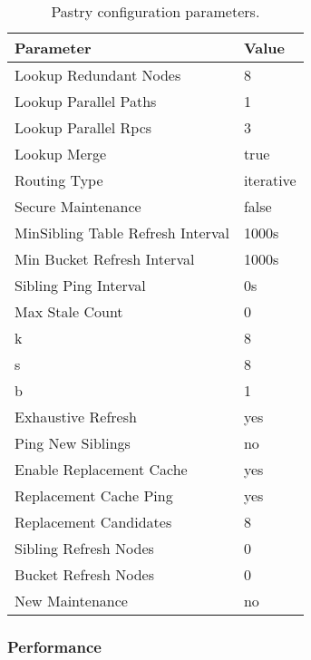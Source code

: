 \begin{table}[htbp]
\centering
\begin{tabular}{|l|l|}
\hline
Parameter                       & Value\\
\hline
Lookup Redundant Nodes          & 8\\
Lookup Parallel Paths           & 1\\
Lookup Parallel Rpcs            & 3\\
Lookup Merge                    & true\\
Routing Type                    & iterative\\
Secure Maintenance              & false\\
MinSibling Table Refresh Interval & 1000s\\
Min Bucket Refresh Interval     & 1000s\\
Sibling Ping Interval           & 0s\\
Max Stale Count                 & 0\\
k                               & 8\\
s                               & 8\\
b                               & 1\\
Exhaustive Refresh              & yes\\
Ping New Siblings               & no\\
Enable Replacement Cache        & yes\\
Replacement Cache Ping          & yes\\
Replacement Candidates          & 8\\
Sibling Refresh Nodes           & 0\\
Bucket Refresh Nodes            & 0\\
New Maintenance                 & no\\
\hline
\end{tabular}
\caption{Pastry configuration parameters.}
\label{tab_kademlia_configs}
\end{table}

\subsubsection{Performance}

